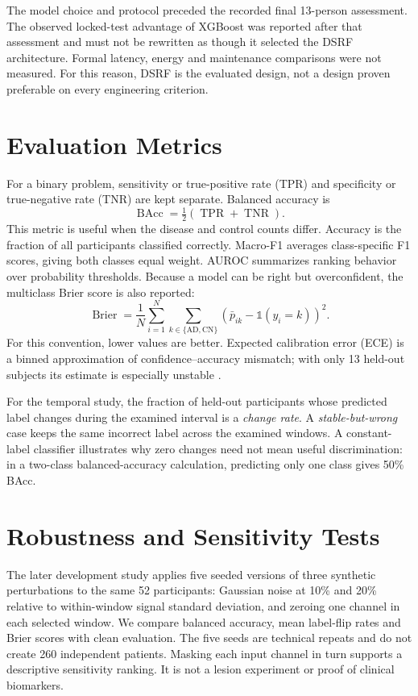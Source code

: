 The model choice and protocol preceded the recorded final 13-person assessment. The observed locked-test advantage of XGBoost was reported after that assessment and must not be rewritten as though it selected the DSRF architecture. Formal latency, energy and maintenance comparisons were not measured. For this reason, DSRF is the evaluated design, not a design proven preferable on every engineering criterion.

\section{Evaluation Metrics}
For a binary problem, sensitivity or true-positive rate (TPR) and specificity or true-negative rate (TNR) are kept separate. Balanced accuracy is
\begin{equation}
\operatorname{BAcc}=\tfrac{1}{2}(\operatorname{TPR}+\operatorname{TNR}).
\end{equation}
This metric is useful when the disease and control counts differ. Accuracy is the fraction of all participants classified correctly. Macro-F1 averages class-specific F1 scores, giving both classes equal weight. AUROC summarizes ranking behavior over probability thresholds. Because a model can be right but overconfident, the multiclass Brier score is also reported:
\begin{equation}
\operatorname{Brier}=\frac{1}{N}\sum_{i=1}^{N}\sum_{k\in\{\mathrm{AD,CN}\}}\left(\bar p_{ik}-\mathbb{1}(y_i=k)\right)^2.
\end{equation}
For this convention, lower values are better. Expected calibration error (ECE) is a binned approximation of confidence--accuracy mismatch; with only 13 held-out subjects its estimate is especially unstable \cite{guo2017calibration}.

For the temporal study, the fraction of held-out participants whose predicted label changes during the examined interval is a \emph{change rate}. A \emph{stable-but-wrong} case keeps the same incorrect label across the examined windows. A constant-label classifier illustrates why zero changes need not mean useful discrimination: in a two-class balanced-accuracy calculation, predicting only one class gives 50\% BAcc.

\section{Robustness and Sensitivity Tests}
The later development study applies five seeded versions of three synthetic perturbations to the same 52 participants: Gaussian noise at 10\% and 20\% relative to within-window signal standard deviation, and zeroing one channel in each selected window. We compare balanced accuracy, mean label-flip rates and Brier scores with clean evaluation. The five seeds are technical repeats and do not create 260 independent patients. Masking each input channel in turn supports a descriptive sensitivity ranking. It is not a lesion experiment or proof of clinical biomarkers.

